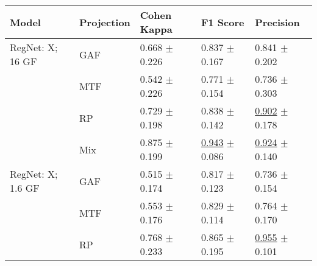 
\begin{tabular}[t]{lllll}
\toprule
Model & Projection & Cohen Kappa & F1 Score & Precision \\
\midrule
RegNet: X; 16 GF & GAF & \textcolor[rgb]{0.4823529412,0.5000000000,0}{0.668} $\pm$ \textcolor[rgb]{0.8082238591,0.1917761409,0}{0.226} & \textcolor[rgb]{0.3947844984,0.5000000000,0}{0.837} $\pm$ \textcolor[rgb]{0.5950883541,0.4049116459,0}{0.167} & \textcolor[rgb]{0.4005235602,0.5000000000,0}{0.841} $\pm$ \textcolor[rgb]{0.4959686841,0.5000000000,0}{0.202} \\
 & MTF & \textcolor[rgb]{0.7264705882,0.2735294118,0}{0.542} $\pm$ \textcolor[rgb]{0.8077447697,0.1922552303,0}{0.226} & \textcolor[rgb]{0.6149945672,0.3850054328,0}{0.771} $\pm$ \textcolor[rgb]{0.5220792004,0.4779207996,0}{0.154} & \textcolor[rgb]{0.7264397906,0.2735602094,0}{0.736} $\pm$ \textcolor[rgb]{0.9882089150,0.0117910850,0}{0.303} \\
 & RP & \textcolor[rgb]{0.3639705882,0.5000000000,0}{0.729} $\pm$ \textcolor[rgb]{0.7085309655,0.2914690345,0}{0.198} & \textcolor[rgb]{0.3918869975,0.5000000000,0}{0.838} $\pm$ \textcolor[rgb]{0.4514233130,0.5000000000,0}{0.142} & \underline{\textcolor[rgb]{0.2120418848,0.5000000000,0}{0.902}} $\pm$ \textcolor[rgb]{0.3778318982,0.5000000000,0}{0.178} \\
 & Mix & \textcolor[rgb]{0.0808823529,0.5000000000,0}{0.875} $\pm$ \textcolor[rgb]{0.7127864450,0.2872135550,0}{0.199} & \underline{\textcolor[rgb]{0.0398406375,0.5000000000,0}{0.943}} $\pm$ \textcolor[rgb]{0.1408376023,0.5000000000,0}{0.086} & \underline{\textcolor[rgb]{0.1433246073,0.5000000000,0}{0.924}} $\pm$ \textcolor[rgb]{0.1910808871,0.5000000000,0}{0.140} \\
RegNet: X; 1.6 GF & GAF & \textcolor[rgb]{0.7794117647,0.2205882353,0}{0.515} $\pm$ \textcolor[rgb]{0.6221710168,0.3778289832,0}{0.174} & \textcolor[rgb]{0.4594953519,0.5000000000,0}{0.817} $\pm$ \textcolor[rgb]{0.3479858267,0.5000000000,0}{0.123} & \textcolor[rgb]{0.7264397906,0.2735602094,0}{0.736} $\pm$ \textcolor[rgb]{0.2617489421,0.5000000000,0}{0.154} \\
 & MTF & \textcolor[rgb]{0.7058823529,0.2941176471,0}{0.553} $\pm$ \textcolor[rgb]{0.6286185571,0.3713814429,0}{0.176} & \textcolor[rgb]{0.4223107570,0.5000000000,0}{0.829} $\pm$ \textcolor[rgb]{0.2968093279,0.5000000000,0}{0.114} & \textcolor[rgb]{0.6400523560,0.3599476440,0}{0.764} $\pm$ \textcolor[rgb]{0.3377261871,0.5000000000,0}{0.170} \\
 & RP & \textcolor[rgb]{0.2882352941,0.5000000000,0}{0.768} $\pm$ \textcolor[rgb]{0.8315938835,0.1684061165,0}{0.233} & \textcolor[rgb]{0.3006157189,0.5000000000,0}{0.865} $\pm$ \textcolor[rgb]{0.7487268837,0.2512731163,0}{0.195} & \underline{\textcolor[rgb]{0.0471204188,0.5000000000,0}{0.955}} $\pm$ \textcolor[rgb]{0.0030521441,0.5000000000,0}{0.101} \\

\end{tabular}
